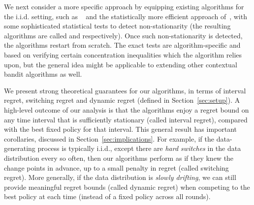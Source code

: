 
We next consider a more specific approach by equipping existing algorithms for the i.i.d. setting,
such as \EG~\citep{LangfordZh08} and the statistically more efficient approach of~\cite{AgarwalHsKaLaLiSc14},
with some sophisticated statistical tests to detect non-stationarity
(the resulting algorithms are called \AdaEG and \AdaILTCB respectively).
Once such non-stationarity is detected, the algorithms restart from scratch.
The exact tests are algorithm-specific and based
on verifying certain concentration inequalities which the algorithm
relies upon, but the general idea might be applicable to extending
other contextual bandit algorithms as well.


We present strong theoretical guarantees for our algorithms, 
in terms of interval regret, switching regret and dynamic
regret (defined in Section~\ref{sec:setup}). 
A high-level outcome of our analysis is that the algorithms enjoy a regret bound on
any time interval that is sufficiently stationary (called interval
regret), compared with the best fixed policy for that interval. 
This general result has important corollaries, discussed in
Section~\ref{sec:implications}. For example, if the data-generating
process is typically i.i.d., except there are \emph{hard switches} in
the data distribution every so often, then our algorithms perform as
if they knew the change points in advance, up to a small penalty in
regret (called switching regret). More generally, if the data
distribution is \emph{slowly drifting}, we can still provide
meaningful regret bounds (called dynamic regret) when competing to the
best policy at each time (instead of a fixed policy across all rounds).

